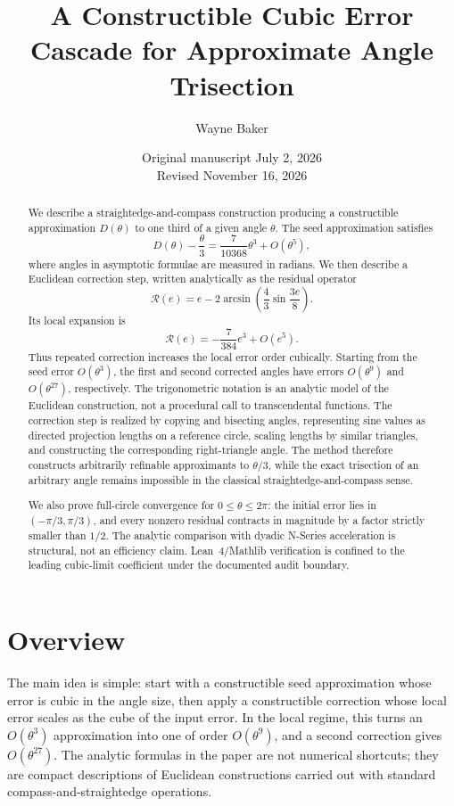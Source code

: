 \documentclass[11pt]{article}
\title{A Constructible Cubic Error Cascade for Approximate Angle Trisection}
\author{Wayne Baker}
\date{Original manuscript July 2, 2026 \\ Revised November 16, 2026}
\theoremstyle{remark}
\newcommand{\Rop}{\mathscr{R}}
\begin{document}
\maketitle

\begin{abstract}
We describe a straightedge-and-compass construction producing a constructible approximation
$D(\theta)$ to one third of a given angle $\theta$.  The seed approximation satisfies
\[
D(\theta)-\frac{\theta}{3}
=
\frac{7}{10368}\theta^3+O(\theta^5),
\]
where angles in asymptotic formulae are measured in radians.  We then describe a Euclidean
correction step, written analytically as the residual operator
\[
\Rop(e)
=
e
-
2\arcsin\!\left(
\frac43\sin\frac{3e}{8}
\right).
\]
Its local expansion is
\[
\Rop(e)
=
-\frac{7}{384}e^3+O(e^5).
\]
Thus repeated correction increases the local error order cubically.  Starting from
the seed error \(O(\theta^3)\), the first and second corrected angles have
errors \(O(\theta^9)\) and \(O(\theta^{27})\), respectively.  The
trigonometric notation is an analytic model of the Euclidean construction, not
a procedural call to transcendental functions.  The correction step is realized
by copying and bisecting angles, representing sine values as directed projection
lengths on a reference circle, scaling lengths by similar triangles, and
constructing the corresponding right-triangle angle.  The method therefore
constructs arbitrarily refinable approximants to \(\theta/3\), while the exact
trisection of an arbitrary angle remains impossible in the classical
straightedge-and-compass sense.

We also prove full-circle convergence for $0\le\theta\le2\pi$:
the initial error lies in $(-\pi/3,\pi/3)$, and every nonzero residual
contracts in magnitude by a factor strictly smaller than $1/2$.
The analytic comparison with dyadic N-Series acceleration is structural,
not an efficiency claim. Lean~4/Mathlib verification is confined to the
leading cubic-limit coefficient under the documented audit boundary.
\end{abstract}

\section*{Overview}

The main idea is simple: start with a constructible seed approximation whose error is cubic in the angle size, then apply a constructible correction whose local error scales as the cube of the input error. In the local regime, this turns an \(O(\theta^3)\) approximation into one of order \(O(\theta^9)\), and a second correction gives \(O(\theta^{27})\). The analytic formulas in the paper are not numerical shortcuts; they are compact descriptions of Euclidean constructions carried out with standard compass-and-straightedge operations.
\end{document}
